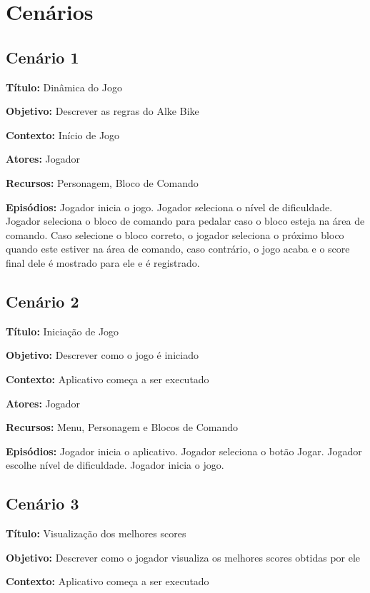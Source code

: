 \section{Cenários}
\subsection{Cenário 1}

\textbf{Título:} Dinâmica do Jogo 

\textbf{Objetivo:} Descrever as regras do Alke Bike 

\textbf{Contexto:} Início de Jogo

\textbf{Atores:} Jogador

\textbf{Recursos:} Personagem, Bloco de Comando

\textbf{Episódios:} Jogador inicia o jogo. Jogador seleciona o nível de dificuldade. Jogador seleciona o bloco de comando para pedalar caso o bloco esteja na área de comando. Caso selecione o bloco correto, o jogador seleciona o próximo bloco quando este estiver na área de comando, caso contrário, o jogo acaba e o score final dele é mostrado para ele e é registrado.

\subsection{Cenário 2}

\textbf{Título:} Iniciação de Jogo

\textbf{Objetivo:} Descrever como o jogo é iniciado 

\textbf{Contexto:} Aplicativo começa a ser executado 

\textbf{Atores:} Jogador

\textbf{Recursos:} Menu, Personagem e Blocos de Comando

\textbf{Episódios:} Jogador inicia o aplicativo. Jogador seleciona o botão Jogar. Jogador escolhe nível de dificuldade. Jogador inicia o jogo.

\subsection{Cenário 3}

\textbf{Título:} Visualização dos melhores scores

\textbf{Objetivo:} Descrever como o jogador visualiza os melhores scores obtidas por ele

\textbf{Contexto:} Aplicativo começa a ser executado

